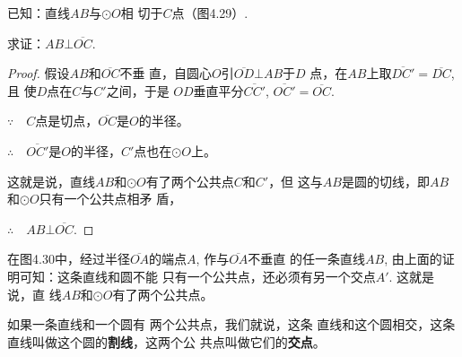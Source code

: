 已知：直线$AB$与$\odot O$相
切于$C$点（图4.29）.

求证：$AB\bot \overline{OC}$.

\begin{proof}
    假设$AB$和$\overline{OC}$不垂
直，自圆心$O$引$\overline{OD}\bot AB$于$D$
点，在$AB$上取$\overline{DC'}=\overline{DC}$, 且
使$D$点在$C$与$C'$之间，于是
$OD$垂直平分$\overline{CC'}$, $\overline{OC'}=\overline{OC}$.

$\because\quad C$点是切点，$\overline{OC}$是$O$的半径。

$\therefore\quad \overline{OC'}$是$O$的半径，$C'$点也在$\odot O$上。

这就是说，直线$AB$和$\odot O$有了两个公共点$C$和$C'$，但
这与$AB$是圆的切线，即$AB$和$\odot O$只有一个公共点相矛
盾，

$\therefore\quad AB\bot \overline{OC}$.
\end{proof}

\begin{figure}[htp]\centering
    \begin{minipage}[t]{0.48\textwidth}
    \centering
    \caption{}
    \end{minipage}
    \begin{minipage}[t]{0.48\textwidth}
    \centering
    \caption{}
    \end{minipage}
    \end{figure}


在图4.30中，经过半径$\overline{OA}$的端点$A$, 作与$\overline{OA}$不垂直
的任一条直线$AB$, 由上面的证明可知：这条直线和圆不能
只有一个公共点，还必须有另一个交点$A'$. 这就是说，直
线$AB$和$\odot O$有了两个公共点。

如果一条直线和一个圆有
两个公共点，我们就说，这条
直线和这个圆相交，这条直线叫做这个圆的\textbf{割线}，这两个公
共点叫做它们的\textbf{交点}。

